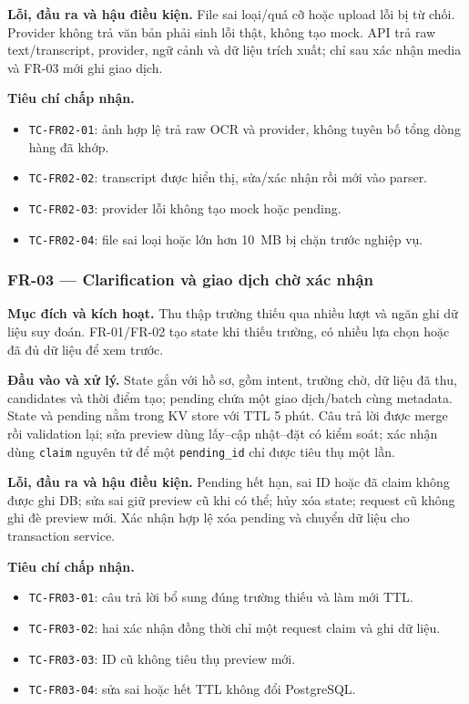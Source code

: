 \textbf{Lỗi, đầu ra và hậu điều kiện.} File sai loại/quá cỡ hoặc upload lỗi bị từ chối. Provider không trả văn bản phải sinh lỗi thật, không tạo mock. API trả raw text/transcript, provider, ngữ cảnh và dữ liệu trích xuất; chỉ sau xác nhận media và FR-03 mới ghi giao dịch.

\textbf{Tiêu chí chấp nhận.}
\begin{itemize}
  \item \texttt{TC-FR02-01}: ảnh hợp lệ trả raw OCR và provider, không tuyên bố tổng dòng hàng đã khớp.
  \item \texttt{TC-FR02-02}: transcript được hiển thị, sửa/xác nhận rồi mới vào parser.
  \item \texttt{TC-FR02-03}: provider lỗi không tạo mock hoặc pending.
  \item \texttt{TC-FR02-04}: file sai loại hoặc lớn hơn 10~MB bị chặn trước nghiệp vụ.
\end{itemize}

\subsubsection{FR-03 --- Clarification và giao dịch chờ xác nhận}

\textbf{Mục đích và kích hoạt.} Thu thập trường thiếu qua nhiều lượt và ngăn ghi dữ liệu suy đoán. FR-01/FR-02 tạo state khi thiếu trường, có nhiều lựa chọn hoặc đã đủ dữ liệu để xem trước.

\textbf{Đầu vào và xử lý.} State gắn với hồ sơ, gồm intent, trường chờ, dữ liệu đã thu, candidates và thời điểm tạo; pending chứa một giao dịch/batch cùng metadata. State và pending nằm trong KV store với TTL 5 phút. Câu trả lời được merge rồi validation lại; sửa preview dùng lấy--cập nhật--đặt có kiểm soát; xác nhận dùng \texttt{claim} nguyên tử để một \texttt{pending\_id} chỉ được tiêu thụ một lần.

\textbf{Lỗi, đầu ra và hậu điều kiện.} Pending hết hạn, sai ID hoặc đã claim không được ghi DB; sửa sai giữ preview cũ khi có thể; hủy xóa state; request cũ không ghi đè preview mới. Xác nhận hợp lệ xóa pending và chuyển dữ liệu cho transaction service.

\textbf{Tiêu chí chấp nhận.}
\begin{itemize}
  \item \texttt{TC-FR03-01}: câu trả lời bổ sung đúng trường thiếu và làm mới TTL.
  \item \texttt{TC-FR03-02}: hai xác nhận đồng thời chỉ một request claim và ghi dữ liệu.
  \item \texttt{TC-FR03-03}: ID cũ không tiêu thụ preview mới.
  \item \texttt{TC-FR03-04}: sửa sai hoặc hết TTL không đổi PostgreSQL.
\end{itemize}

